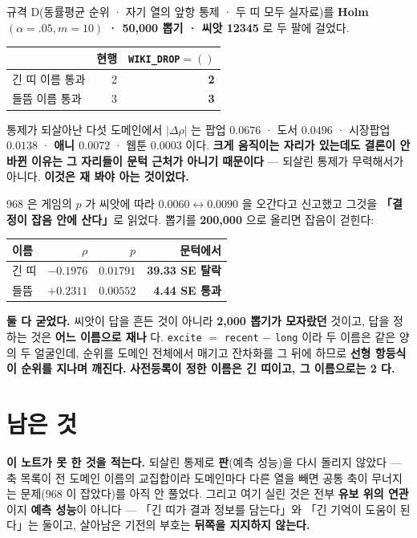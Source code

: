 \documentclass[10pt]{article}
\begin{document}

규격 D(동률평균 순위 · 자기 열의 앞항 통제 · 두 띠 모두 실자료)를
\textbf{Holm$(\alpha{=}.05, m{=}10)$ · 50{,}000 뽑기 · 씨앗 12345} 로 두 팔에 걸었다.

\begin{center}\small
\begin{tabular}{lrr}
 & 현행 & \textbf{\texttt{WIKI\_DROP}$=()$} \\
\hline
긴 띠 이름 통과 & 2 & \textbf{2} \\
들뜸 이름 통과 & 3 & \textbf{3} \\
\end{tabular}
\end{center}

통제가 되살아난 다섯 도메인에서 $|\Delta\rho|$ 는 팝업 $0.0676$ · 도서 $0.0496$ ·
시장팝업 $0.0138$ · \textbf{애니 $0.0072$} · 웹툰 $0.0003$ 이다. \textbf{크게 움직이는
자리가 있는데도 결론이 안 바뀐 이유는 그 자리들이 문턱 근처가 아니기 때문이다} ---
되살린 통제가 무력해서가 아니다. \textbf{이것은 재 봐야 아는 것이었다.}


968 은 게임의 $p$ 가 씨앗에 따라 $0.0060 \leftrightarrow 0.0090$ 을 오간다고 신고했고
그것을 \textbf{「결정이 잡음 안에 산다」}로 읽었다. 뽑기를 \textbf{200{,}000} 으로 올리면
잡음이 걷힌다:

\begin{center}\small
\begin{tabular}{lrrr}
이름 & $\rho$ & $p$ & 문턱에서 \\
\hline
긴 띠 & $-0.1976$ & $0.01791$ & \textbf{39.33 SE 탈락} \\
들뜸 & $+0.2311$ & $0.00552$ & \textbf{4.44 SE 통과} \\
\end{tabular}
\end{center}

\textbf{둘 다 굳었다.} 씨앗이 답을 흔든 것이 아니라 \textbf{2{,}000 뽑기가 모자랐던} 것이고,
답을 정하는 것은 \textbf{어느 이름으로 재나} 다. \texttt{excite} $=$ \texttt{recent}
$-$ \texttt{long} 이라 두 이름은 같은 양의 두 얼굴인데, 순위를 도메인 전체에서 매기고
잔차화를 그 뒤에 하므로 \textbf{선형 항등식이 순위를 지나며 깨진다.}
\textbf{사전등록이 정한 이름은 긴 띠이고, 그 이름으로는 2 다.}

\section{남은 것}

\textbf{이 노트가 못 한 것을 적는다.} 되살린 통제로 \textbf{판}(예측 성능)을 다시 돌리지
않았다 --- 축 목록이 전 도메인 이름의 교집합이라 도메인마다 다른 열을 빼면 공통 축이
무너지는 문제(968 이 잡았다)를 아직 안 풀었다. 그리고 여기 실린 것은 전부
\textbf{유보 위의 연관}이지 \textbf{예측 성능}이 아니다 --- 「긴 띠가 결과 정보를 담는다」와
「긴 기억이 도움이 된다」는 둘이고, 살아남은 기전의 부호는 \textbf{뒤쪽을 지지하지 않는다.}
\end{document}
